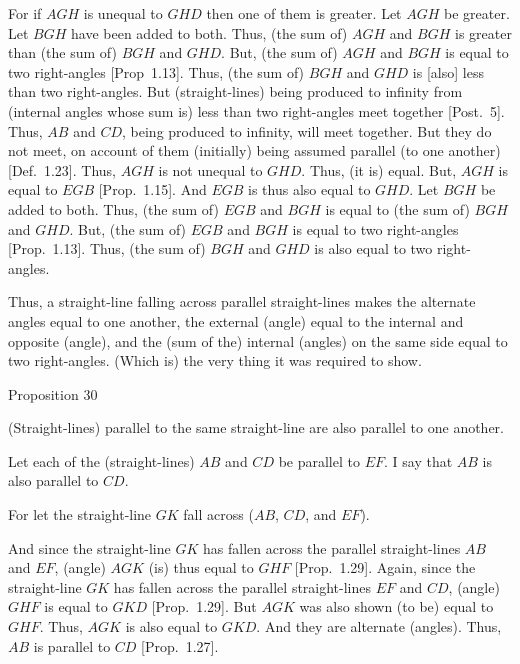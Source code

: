 For if $AGH$ is unequal to $GHD$ then one of them is greater. Let $AGH$ be greater.
Let $BGH$ have been added to both. Thus, (the sum of) $AGH$ and $BGH$ is greater
than (the sum of) $BGH$ and $GHD$. But, (the sum of) $AGH$ and $BGH$ is equal to two right-angles
[Prop~1.13]. Thus,  (the sum of) $BGH$ and $GHD$ is [also] less than two right-angles. 
But (straight-lines) being produced to infinity from (internal angles whose sum is) less than
two right-angles meet together [Post.~5]. Thus, $AB$ and $CD$, being produced to
infinity, will meet together. But they do not meet, on account of
them (initially) being assumed parallel (to one another) [Def.~1.23]. Thus, $AGH$ is not unequal to $GHD$. Thus, (it is) equal. But, $AGH$ is equal to $EGB$ [Prop.~1.15]. 
And $EGB$ is thus also equal to $GHD$.
Let $BGH$
be added to both. Thus, (the sum of) $EGB$ and $BGH$ is equal to (the sum of) $BGH$ and $GHD$.
But, (the sum of) $EGB$ and $BGH$ is equal to two right-angles [Prop.~1.13]. 
Thus, (the sum of) $BGH$ and $GHD$ is also equal to two right-angles.

Thus, a straight-line falling across parallel straight-lines makes the alternate angles
equal to one another,  the external (angle) equal to the internal and
opposite (angle), and the (sum of the) internal (angles) on the same side equal to
two right-angles. (Which is) the very thing it was required to show.


\begin{center}
{\large Proposition 30}
\end{center}

(Straight-lines) parallel to the same straight-line are also parallel
to one another.

\epsfysize=2in
\centerline{}

Let each of the (straight-lines) $AB$ and $CD$ be parallel to $EF$. I say that
$AB$ is also parallel to $CD$.

For let the straight-line $GK$ fall across  ($AB$, $CD$, and $EF$).

And since the straight-line $GK$ has fallen across the parallel straight-lines $AB$ and $EF$, (angle) $AGK$
(is) thus equal to $GHF$ [Prop.~1.29]. Again, since the straight-line $GK$ has fallen across the parallel
straight-lines $EF$ and $CD$, (angle) $GHF$ is equal to $GKD$ [Prop.~1.29].
But $AGK$ was also shown (to be) equal to $GHF$. Thus, $AGK$ is also equal to 
$GKD$. And they are alternate (angles). Thus, $AB$ is parallel to $CD$ [Prop.~1.27].

